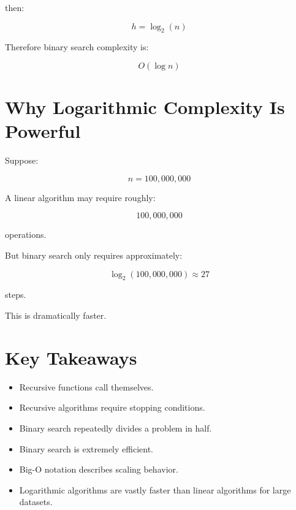 \documentclass[11pt]{article}
\begin{document}
then:

\[
h = \log_2(n)
\]

Therefore binary search complexity is:

\[
O(\log n)
\]

\section{Why Logarithmic Complexity Is Powerful}

Suppose:

\[
n = 100,000,000
\]

A linear algorithm may require roughly:

\[
100,000,000
\]

operations.

But binary search only requires approximately:

\[
\log_2(100,000,000) \approx 27
\]

steps.

This is dramatically faster.

\section{Key Takeaways}

\begin{itemize}
    \item Recursive functions call themselves.
    \item Recursive algorithms require stopping conditions.
    \item Binary search repeatedly divides a problem in half.
    \item Binary search is extremely efficient.
    \item Big-O notation describes scaling behavior.
    \item Logarithmic algorithms are vastly faster than linear algorithms for large datasets.
\end{itemize}
\end{document}

